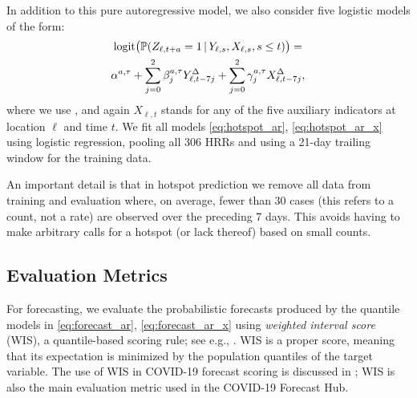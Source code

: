 \documentclass[9pt,twocolumn,twoside,lineno]{pnas-new}
\begin{document}
In addition to this pure autoregressive model, we also consider five
logistic models of the form:  
\begin{multline}
\label{eq:hotspot_ar_x}
\mathrm{logit} \big( \mathbb{P}(Z_{\ell,t+a} = 1 \,|\, Y_{\ell,s}, X_{\ell,s}, s \leq t) \big)
= \\ \alpha^{a,\tau} + \sum_{j=0}^2 \beta^{a,\tau}_j Y^\Delta_{\ell,t-7j} +  
\sum_{j=0}^2 \gamma^{a,\tau}_j X^\Delta_{\ell,t-7j},
\end{multline}
where we use , and again $X_{\ell,t}$ stands for any of the five  
auxiliary indicators at location $\ell$ and time $t$.  We fit all models
\eqref{eq:hotspot_ar}, \eqref{eq:hotspot_ar_x} using logistic regression, 
pooling all 306 HRRs and using a 21-day trailing window for the training data.   

An important detail is that in hotspot prediction we remove all data from
training and evaluation where, on average, fewer than 30 cases (this refers to a
count, not a rate) are observed over the preceding 7 days. This avoids having to
make arbitrary calls for a hotspot (or lack thereof) based on small counts.   

\subsection{Evaluation Metrics}

For forecasting, we evaluate the probabilistic forecasts produced by the
quantile models in \eqref{eq:forecast_ar}, \eqref{eq:forecast_ar_x} using 
\textit{weighted interval score} (WIS), a quantile-based scoring rule; see e.g.,
\cite{Gneiting:2007}.  WIS is a proper score, meaning that its expectation
is minimized by the population quantiles of the target variable.  The use of WIS
in COVID-19 forecast scoring is discussed in \cite{Bracher:2021}; WIS is also
the main evaluation metric used in the COVID-19 Forecast Hub.   
\end{document}

